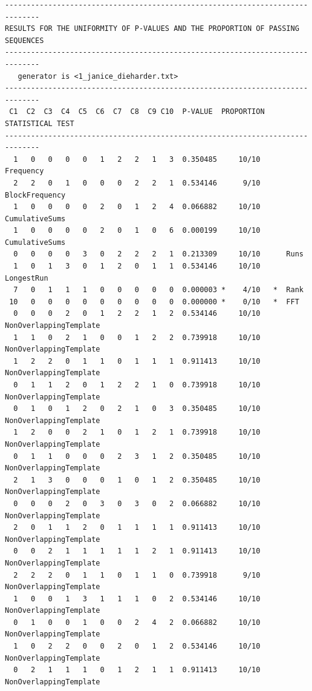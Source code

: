 \documentclass[12pt, titlepage]{report}
\theoremstyle{definition}
\begin{document}
\begin{verbatim}
------------------------------------------------------------------------------
RESULTS FOR THE UNIFORMITY OF P-VALUES AND THE PROPORTION OF PASSING SEQUENCES
------------------------------------------------------------------------------
   generator is <1_janice_dieharder.txt>
------------------------------------------------------------------------------
 C1  C2  C3  C4  C5  C6  C7  C8  C9 C10  P-VALUE  PROPORTION  STATISTICAL TEST
------------------------------------------------------------------------------
  1   0   0   0   0   1   2   2   1   3  0.350485     10/10      Frequency
  2   2   0   1   0   0   0   2   2   1  0.534146      9/10      BlockFrequency
  1   0   0   0   0   2   0   1   2   4  0.066882     10/10      CumulativeSums
  1   0   0   0   0   2   0   1   0   6  0.000199     10/10      CumulativeSums
  0   0   0   0   3   0   2   2   2   1  0.213309     10/10      Runs
  1   0   1   3   0   1   2   0   1   1  0.534146     10/10      LongestRun
  7   0   1   1   1   0   0   0   0   0  0.000003 *    4/10   *  Rank
 10   0   0   0   0   0   0   0   0   0  0.000000 *    0/10   *  FFT
  0   0   0   2   0   1   2   2   1   2  0.534146     10/10      NonOverlappingTemplate
  1   1   0   2   1   0   0   1   2   2  0.739918     10/10      NonOverlappingTemplate
  1   2   2   0   1   1   0   1   1   1  0.911413     10/10      NonOverlappingTemplate
  0   1   1   2   0   1   2   2   1   0  0.739918     10/10      NonOverlappingTemplate
  0   1   0   1   2   0   2   1   0   3  0.350485     10/10      NonOverlappingTemplate
  1   2   0   0   2   1   0   1   2   1  0.739918     10/10      NonOverlappingTemplate
  0   1   1   0   0   0   2   3   1   2  0.350485     10/10      NonOverlappingTemplate
  2   1   3   0   0   0   1   0   1   2  0.350485     10/10      NonOverlappingTemplate
  0   0   0   2   0   3   0   3   0   2  0.066882     10/10      NonOverlappingTemplate
  2   0   1   1   2   0   1   1   1   1  0.911413     10/10      NonOverlappingTemplate
  0   0   2   1   1   1   1   1   2   1  0.911413     10/10      NonOverlappingTemplate
  2   2   2   0   1   1   0   1   1   0  0.739918      9/10      NonOverlappingTemplate
  1   0   0   1   3   1   1   1   0   2  0.534146     10/10      NonOverlappingTemplate
  0   1   0   0   1   0   0   2   4   2  0.066882     10/10      NonOverlappingTemplate
  1   0   2   2   0   0   2   0   1   2  0.534146     10/10      NonOverlappingTemplate
  0   2   1   1   1   0   1   2   1   1  0.911413     10/10      NonOverlappingTemplate

\end{verbatim}
\end{document}
